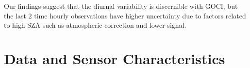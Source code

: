 \documentclass[onecolumn,3p,letterpaper,11pt]{elsarticle}
\begin{document}


Our findings suggest that the diurnal variability is discernible with GOCI, but the last 2 time hourly observations have higher uncertainty due to factors related to high SZA such as atmospheric correction and lower signal.




\section{Data and Sensor Characteristics}
\end{document}

